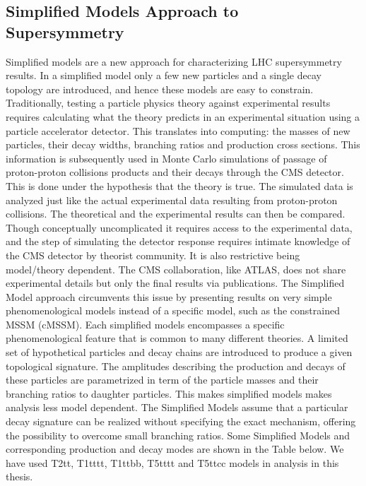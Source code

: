 \subsection{Simplified Models Approach to Supersymmetry}

Simplified models \cite{SSM} are a new approach for characterizing LHC supersymmetry results. In a simplified model only a few new particles and a single decay topology are introduced, and hence these models are easy to constrain. Traditionally, testing a particle physics theory against experimental results requires calculating what the theory predicts in an experimental situation using a particle accelerator detector. This translates into computing: the masses of new particles, their decay widths, branching ratios and production cross sections. This information is subsequently used in Monte Carlo simulations of passage of proton-proton collisions products and their decays through the CMS detector. This is done under the hypothesis that the theory is true. The simulated data is  analyzed just like the actual experimental data resulting from proton-proton collisions. The theoretical and the experimental results can then be compared. Though conceptually uncomplicated it requires access to the experimental data, and the step of simulating the detector response requires intimate knowledge of the CMS detector by theorist community. It is also restrictive being model/theory dependent. The CMS collaboration, like ATLAS, does not share experimental details but only the final results via publications. The Simplified Model approach circumvents this issue by presenting results on very simple phenomenological models instead of a specific model, such as the constrained MSSM (cMSSM). Each simplified models encompasses a specific phenomenological feature that is common to many different theories. A limited set of hypothetical particles and decay chains are introduced to produce a given topological signature. The amplitudes describing the production and decays of these particles are parametrized in term of the particle masses and their branching ratios to daughter particles. This makes simplified models makes analysis less model dependent. The  Simplified Models assume that a particular decay signature can be realized without specifying the exact mechanism, offering the possibility to overcome small branching ratios. Some Simplified Models and corresponding production and decay modes are shown in the Table below. We have used T2tt, T1tttt, T1ttbb, T5tttt and T5ttcc models in analysis in this thesis.




